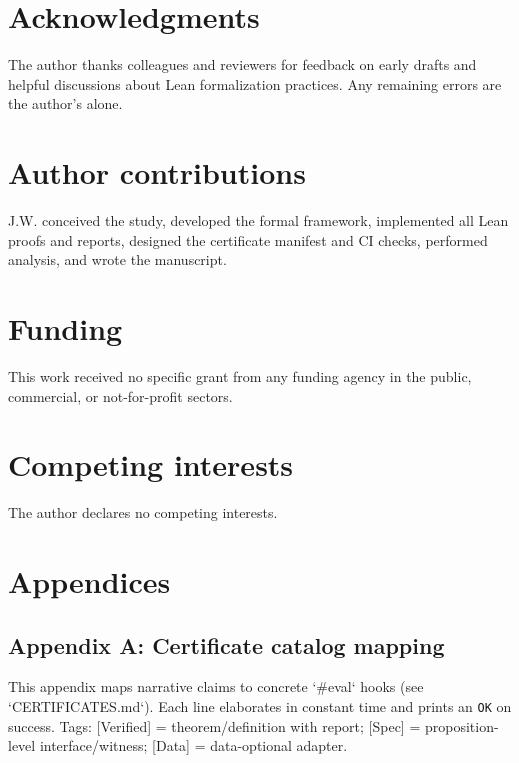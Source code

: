 \documentclass[11pt,a4paper,twoside]{article}
\numberwithin{equation}{section}
\theoremstyle{customthm}
\theoremstyle{customdef}
\theoremstyle{customrem}
\begin{document}
\section*{Acknowledgments}\label{sec:acknowledgments}
The author thanks colleagues and reviewers for feedback on early drafts and helpful discussions about Lean formalization practices. Any remaining errors are the author's alone.

\section*{Author contributions}\label{sec:author-contrib}
J.W. conceived the study, developed the formal framework, implemented all Lean proofs and reports, designed the certificate manifest and CI checks, performed analysis, and wrote the manuscript.

\section*{Funding}\label{sec:funding}
This work received no specific grant from any funding agency in the public, commercial, or not-for-profit sectors.

\section*{Competing interests}\label{sec:competing-interests}
The author declares no competing interests.

\section*{Appendices}

\subsection*{Appendix A: Certificate catalog mapping}\label{app:cert-catalog}
This appendix maps narrative claims to concrete `#eval` hooks (see `CERTIFICATES.md`). Each line elaborates in constant time and prints an \texttt{OK} on success. Tags: [Verified] = theorem/definition with report; [Spec] = proposition-level interface/witness; [Data] = data-optional adapter.
\end{document}
